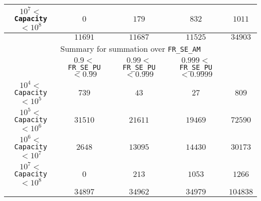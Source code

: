 \begin{center}
\begin{table}[htbp]
\begin{center}
\begin{tabular}{|c||c|c|c||c|}
\hline
$10^7 <$ \texttt{Capacity} $< 10^8$&$0$&$179$&$832$&$1011$\\
\hline
&$11691$&$11687$&$11525$&$34903$\\
\hline
\hline
\multicolumn{5}{|c|}{Summary for summation over \texttt{FR\_SE\_AM}}\\
\hline
&$0.9 <$ \texttt{FR\_SE\_PU} $< 0.99$&$0.99 <$ \texttt{FR\_SE\_PU} $< 0.999$&$0.999 <$ \texttt{FR\_SE\_PU} $< 0.9999$&\\
\hline
$10^4 <$ \texttt{Capacity} $< 10^5$&$739$&$43$&$27$&$809$\\
\hline
$10^5 <$ \texttt{Capacity} $< 10^6$&$31510$&$21611$&$19469$&$72590$\\
\hline
$10^6 <$ \texttt{Capacity} $< 10^7$&$2648$&$13095$&$14430$&$30173$\\
\hline
$10^7 <$ \texttt{Capacity} $< 10^8$&$0$&$213$&$1053$&$1266$\\
\hline
&$34897$&$34962$&$34979$&$104838$\\
\hline
\end{tabular}
\end{center}
\end{table}
\end{center}



